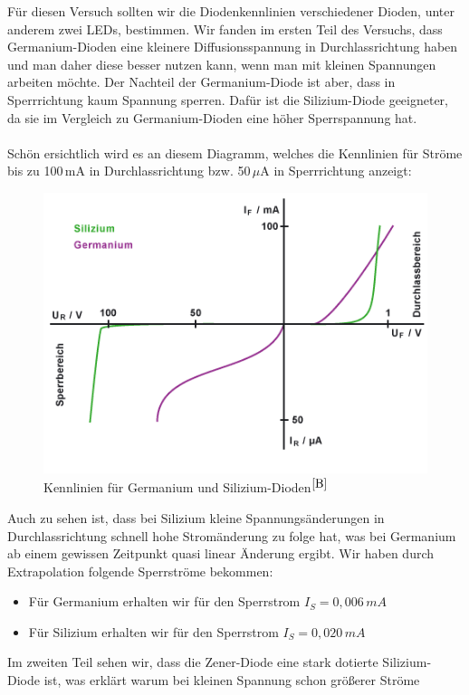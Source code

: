 \documentclass[fontsize=12pt]{scrartcl}
\begin{document}
Für diesen Versuch sollten wir die Diodenkennlinien verschiedener Dioden, unter anderem zwei LEDs, bestimmen. 
Wir fanden im ersten Teil des Versuchs, dass Germanium-Dioden eine kleinere Diffusionsspannung in Durchlassrichtung haben und man daher diese besser nutzen kann, wenn man mit kleinen Spannungen arbeiten möchte. Der Nachteil der Germanium-Diode ist aber, dass in Sperrrichtung kaum Spannung sperren. Dafür ist die Silizium-Diode geeigneter, da sie im Vergleich zu Germanium-Dioden eine höher Sperrspannung hat. \\
~\\
Schön ersichtlich wird es an diesem Diagramm, welches die Kennlinien für Ströme bis zu 100\,mA in Durchlassrichtung bzw. 50\,$\mu$A in Sperrrichtung 
anzeigt:
\begin{figure}[H]
\centering
\includegraphics[scale=1]{Graphik/bsp}
\caption{Kennlinien für Germanium und Silizium-Dioden$^{\cite{B}}$}
\end{figure}
\noindent
Auch zu sehen ist, dass bei Silizium kleine Spannungsänderungen in Durchlassrichtung schnell hohe Stromänderung zu folge hat, was bei Germanium ab einem gewissen Zeitpunkt quasi linear Änderung ergibt. Wir haben durch Extrapolation folgende Sperrströme bekommen:
\begin{itemize}
\item Für Germanium erhalten wir für den Sperrstrom $I_S=0,006\,mA$
\item Für Silizium erhalten wir für den Sperrstrom $I_S=0,020\,mA$
\end{itemize}
\noindent
Im zweiten Teil sehen wir, dass die Zener-Diode eine stark dotierte Silizium-Diode ist, was erklärt warum bei kleinen Spannung schon größerer Ströme 
\end{document}
